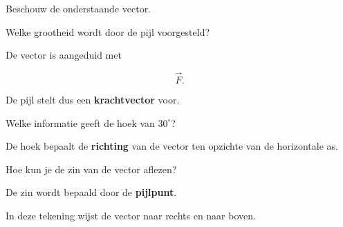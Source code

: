 \documentclass{ximera}
\begin{document}
\begin{oefening}{\oefB\ESS}

Beschouw de onderstaande vector.

\begin{center}
\end{center}


\begin{question}
Welke grootheid wordt door de pijl voorgesteld?

\begin{oplossing}
De vector is aangeduid met

\[
\vec{F}.
\]

De pijl stelt dus een \textbf{krachtvector} voor.
\end{oplossing}
\end{question}


\begin{question}
Welke informatie geeft de hoek van $30^\circ$?

\begin{oplossing}
De hoek bepaalt de \textbf{richting} van de vector ten opzichte van de
horizontale as.
\end{oplossing}
\end{question}


\begin{question}
Hoe kun je de zin van de vector aflezen?

\begin{oplossing}
De zin wordt bepaald door de \textbf{pijlpunt}.

In deze tekening wijst de vector naar rechts en naar boven.
\end{oplossing}
\end{question}

\end{oefening}
\end{document}
